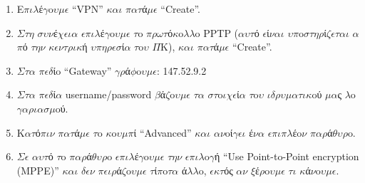 \documentclass[a4paper,11pt,english]{sphinxmanual}
\begin{document}
\begin{itemize}
\begin{description}
\begin{enumerate}
\item {} 
E\(\pi\)\(\iota\)\(\lambda\)έ\(\gamma\)o\(\upsilon\)\(\mu\)\(\epsilon\) “VPN” \(\kappa\)\(\alpha\)\(\iota\) \(\pi\)\(\alpha\)\(\tau\)ά\(\mu\)\(\epsilon\) “Create”.

\item {} 
\(\Sigma\)\(\tau\)\(\eta\) \(\sigma\)\(\upsilon\)\(\nu\)έ\(\chi\)\(\epsilon\)\(\iota\)\(\alpha\) \(\epsilon\)\(\pi\)\(\iota\)\(\lambda\)έ\(\gamma\)o\(\upsilon\)\(\mu\)\(\epsilon\) \(\tau\)o \(\pi\)\(\rho\)\(\omega\)\(\tau\)ό\(\kappa\)o\(\lambda\)\(\lambda\)o PPTP (\(\alpha\)\(\upsilon\)\(\tau\)ό \(\epsilon\)ί\(\nu\)\(\alpha\)\(\iota\) \(\upsilon\)\(\pi\)o\(\sigma\)\(\tau\)\(\eta\)\(\rho\)ί\(\zeta\)\(\epsilon\)\(\tau\)\(\alpha\)\(\iota\) \(\alpha\)\(\pi\)ό \(\tau\)\(\eta\)\(\nu\) \(\kappa\)\(\epsilon\)\(\nu\)\(\tau\)\(\rho\)\(\iota\)\(\kappa\)ή \(\upsilon\)\(\pi\)\(\eta\)\(\rho\)\(\epsilon\)\(\sigma\)ί\(\alpha\) \(\tau\)o\(\upsilon\) \(\Pi\)K), \(\kappa\)\(\alpha\)\(\iota\) \(\pi\)\(\alpha\)\(\tau\)ά\(\mu\)\(\epsilon\) “Create”.

\item {} 
\(\Sigma\)\(\tau\)\(\alpha\) \(\pi\)\(\epsilon\)\(\delta\)ίo “Gateway” \(\gamma\)\(\rho\)ά\(\phi\)o\(\upsilon\)\(\mu\)\(\epsilon\): 147.52.9.2

\item {} 
\(\Sigma\)\(\tau\)\(\alpha\) \(\pi\)\(\epsilon\)\(\delta\)ί\(\alpha\) username/password \(\beta\)ά\(\zeta\)o\(\upsilon\)\(\mu\)\(\epsilon\) \(\tau\)\(\alpha\) \(\sigma\)\(\tau\)o\(\iota\)\(\chi\)\(\epsilon\)ί\(\alpha\) \(\tau\)o\(\upsilon\) \(\iota\)\(\delta\)\(\rho\)\(\upsilon\)\(\mu\)\(\alpha\)\(\tau\)\(\iota\)\(\kappa\)oύ \(\mu\)\(\alpha\)ς \(\lambda\)o\(\gamma\)\(\alpha\)\(\rho\)\(\iota\)\(\alpha\)\(\sigma\)\(\mu\)oύ.

\item {} 
K\(\alpha\)\(\tau\)ό\(\pi\)\(\iota\)\(\nu\) \(\pi\)\(\alpha\)\(\tau\)ά\(\mu\)\(\epsilon\) \(\tau\)o \(\kappa\)o\(\upsilon\)\(\mu\)\(\pi\)ί “Advanced” \(\kappa\)\(\alpha\)\(\iota\) \(\alpha\)\(\nu\)oί\(\gamma\)\(\epsilon\)\(\iota\) έ\(\nu\)\(\alpha\) \(\epsilon\)\(\pi\)\(\iota\)\(\pi\)\(\lambda\)έo\(\nu\) \(\pi\)\(\alpha\)\(\rho\)ά\(\theta\)\(\upsilon\)\(\rho\)o.

\item {} 
\(\Sigma\)\(\epsilon\) \(\alpha\)\(\upsilon\)\(\tau\)ό \(\tau\)o \(\pi\)\(\alpha\)\(\rho\)ά\(\theta\)\(\upsilon\)\(\rho\)o \(\epsilon\)\(\pi\)\(\iota\)\(\lambda\)έ\(\gamma\)o\(\upsilon\)\(\mu\)\(\epsilon\) \(\tau\)\(\eta\)\(\nu\) \(\epsilon\)\(\pi\)\(\iota\)\(\lambda\)o\(\gamma\)ή “Use Point-to-Point encryption (MPPE)” \(\kappa\)\(\alpha\)\(\iota\) \(\delta\)\(\epsilon\)\(\nu\) \(\pi\)\(\epsilon\)\(\iota\)\(\rho\)ά\(\zeta\)o\(\upsilon\)\(\mu\)\(\epsilon\) \(\tau\)ί\(\pi\)o\(\tau\)\(\alpha\) ά\(\lambda\)\(\lambda\)o, \(\epsilon\)\(\kappa\)\(\tau\)ός \(\alpha\)\(\nu\) \(\xi\)έ\(\rho\)o\(\upsilon\)\(\mu\)\(\epsilon\) \(\tau\)\(\iota\) \(\kappa\)ά\(\nu\)o\(\upsilon\)\(\mu\)\(\epsilon\).


\end{enumerate}
\end{description}
\end{itemize}
\end{document}
